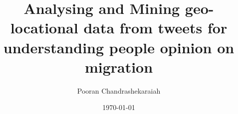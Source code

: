 \documentclass[
    numbers=noenddot,
    parskip=half-,
    fontsize=12pt,
    paper=a4,
    oneside,
    titlepage,
    bibliography=totoc,
    chapterprefix=false,
]{scrbook}
\title{Analysing and Mining geo-locational data from tweets for understanding people opinion on migration}
\author{Pooran Chandrashekaraiah}
\date{\today}
\begin{document}
\frontmatter
%


\tableofcontents
\newpage


\newpage


\newpage

\thispagestyle{empty}
\cleardoublepage
\listoffigures
\newpage

\thispagestyle{empty}
\cleardoublepage
\listoftables
\newpage

\mainmatter









\begin{appendices}
    
\end{appendices}
\newpage


\backmatter

\printbibliography


\end{document}
